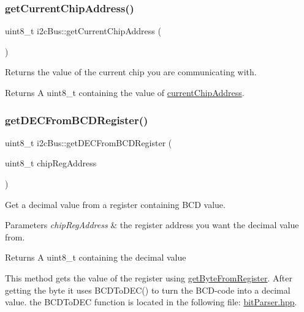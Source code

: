 \subsubsection{\texorpdfstring{get\+Current\+Chip\+Address()}{getCurrentChipAddress()}}
{\footnotesize\ttfamily uint8\+\_\+t i2c\+Bus\+::get\+Current\+Chip\+Address (\begin{DoxyParamCaption}{ }\end{DoxyParamCaption})}



Returns the value of the current chip you are communicating with. 

\begin{DoxyReturn}{Returns}
A uint8\+\_\+t containing the value of \mbox{\hyperlink{classi2c_bus_a64ff87527c88619d72ede947d73eac3a}{current\+Chip\+Address}}. 
\end{DoxyReturn}
\mbox{\label{classi2c_bus_a30d44d89d2f9b0d290cb2a207f6a4777}} 
\subsubsection{\texorpdfstring{get\+D\+E\+C\+From\+B\+C\+D\+Register()}{getDECFromBCDRegister()}}
{\footnotesize\ttfamily uint8\+\_\+t i2c\+Bus\+::get\+D\+E\+C\+From\+B\+C\+D\+Register (\begin{DoxyParamCaption}\item[{uint8\+\_\+t}]{chip\+Reg\+Address }\end{DoxyParamCaption})}



Get a decimal value from a register containing B\+CD value. 


\begin{DoxyParams}{Parameters}
{\em chip\+Reg\+Address} & the register address you want the decimal value from. \\
\hline
\end{DoxyParams}
\begin{DoxyReturn}{Returns}
A uint8\+\_\+t containing the decimal value
\end{DoxyReturn}
This method gets the value of the register using \mbox{\hyperlink{classi2c_bus_a7f83afc0264e758214db63cca336846d}{get\+Byte\+From\+Register}}. After getting the byte it uses B\+C\+D\+To\+D\+E\+C() to turn the B\+C\+D-\/code into a decimal value. the B\+C\+D\+To\+D\+EC function is located in the following file\+: \mbox{\hyperlink{bit_parser_8hpp_source}{bit\+Parser.\+hpp}}. \mbox{\label{classi2c_bus_a3b2f595372a05bde8e1cf9d6a86f2bdb}} 
